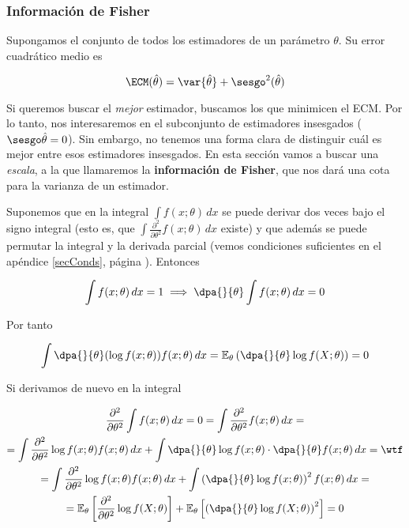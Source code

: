 \documentclass{apuntes}
\begin{document}
\subsubsection{Información de Fisher}

Supongamos el conjunto de todos los estimadores de un parámetro $\theta$. Su error cuadrático medio es

\[ \ECM(\hat\theta) = \var{\hat\theta} + \sesgo^2(\hat\theta) \]

Si queremos buscar el \textit{mejor} estimador, buscamos los que minimicen el ECM. Por lo tanto, nos interesaremos en el subconjunto de estimadores insesgados ($\sesgo \hat\theta = 0$). Sin embargo, no tenemos una forma clara de distinguir cuál es mejor entre esos estimadores insesgados. En esta sección vamos a buscar una \textit{escala}, a la que llamaremos la \textbf{información de Fisher}, que nos dará una cota para la varianza de un estimador.

Suponemos que en la integral $\int f(x;\theta)\,dx$ se puede derivar dos veces bajo el signo integral (esto es, que $\int \frac{\partial^2}{\partial\theta^2} f(x;\theta)\,dx$ existe) y que además se puede permutar la integral y la derivada parcial (vemos condiciones suficientes en el apéndice \ref{secConds}, página \pageref{secConds}). Entonces

\[ \int f(x;\theta)\, dx = 1 \implies \dpa{}{\theta} \int f(x;\theta)\,dx = 0 \]

Por tanto

\[ \int \dpa{}{\theta}(\log f(x;\theta) ) f(x;\theta) \, dx = \mathbb{E}_\theta\left(\dpa{}{\theta}\log f(X;\theta)\right) = 0 \]

Si derivamos de nuevo en la integral

\begin{gather*}
\frac{\partial^2}{\partial\theta^2} \int f(x;\theta)\,dx = 0  = \int \frac{\partial^2}{\partial\theta^2} f(x;\theta)\,dx = \\
=\int \frac{\partial^2}{\partial\theta^2} \log f(x;\theta) f(x;\theta)\,dx + \int\dpa{}{\theta} \log f(x;\theta) \cdot \dpa{}{\theta}f(x;\theta)\,dx = \wtf \\
=\int \frac{\partial^2}{\partial\theta^2}\log f(x;\theta) f(x;\theta)\, dx + \int \left(\dpa{}{\theta}\log f(x;\theta)\right)^2 f(x;\theta)\,dx = \\
= \mathbb{E}_\theta \left[\frac{\partial^2}{\partial\theta^2}\log f(X;\theta) \right]
	+ \mathbb{E}_\theta \left[ \left(\dpa{}{\theta} \log f(X;\theta)\right)^2\right] = 0
\end{gather*}
\end{document}
